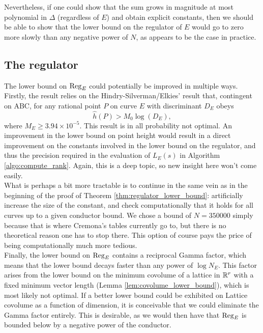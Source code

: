 Nevertheless, if one could show that the sum grows in magnitude at most polynomial in $\Delta$ (regardless of $E$) and obtain explicit constants, then we should be able to show that the lower bound on the regulator of $E$ would go to zero more slowly than any negative power of $N$, as appears to be the case in practice. \\

\subsection{The regulator}

The lower bound on $\operatorname{Reg}_E$ could potentially be improved in multiple ways. Firstly, the result relies on the Hindry-Silverman/Elkies' result \cite{Elk-2006} that, contingent on ABC, for any rational point $P$ on curve $E$ with discriminant $D_E$ obeys
\begin{equation}
\hat{h}(P) > M_0 \log(D_E),
\end{equation}
where $M_E \ge 3.94\times 10^{-5}$. This result is in all probability not optimal. An improvement in the lower bound on point height would result in a direct improvement on the constants involved in the lower bound on the regulator, and thus the precision required in the evaluation of $L_E(s)$ in Algorithm \ref{algo:compute_rank}. Again, this is a deep topic, so new insight here won't come easily. \\

What is perhaps a bit more tractable is to continue in the same vein as in the beginning of the proof of Theorem \ref{thm:regulator_lower_bound}: artificially increase the size of the constant, and check computationally that it holds for all curves up to a given conductor bound. We chose a bound of $N=350000$ simply because that is where Cremona's tables currently go to, but there is no theoretical reason one has to stop there. This option of course pays the price of being computationally much more tedious. \\

Finally, the lower bound on $\operatorname{Reg}_E$ contains a reciprocal Gamma factor, which means that the lower bound decays faster than any power of $\log N_E$. This factor arises from the lower bound on the minimum covolume of a lattice in $\mathbb{R}^r$ with a fixed minimum vector length (Lemma \ref{lem:covolume_lower_bound}), which is most likely not optimal. If a better lower bound could be exhibited on Lattice covolume as a function of dimension, it is conceivable that we could eliminate the Gamma factor entirely. This is desirable, as we would then have that $\operatorname{Reg}_E$ is bounded below by a negative power of the conductor.

